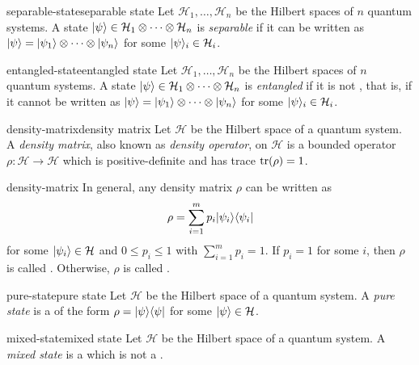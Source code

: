 \begin{topic}{separable-state}{separable state}
    Let $\mathcal{H}_1, \ldots, \mathcal{H}_n$ be the Hilbert spaces of $n$ quantum systems. A state $|\psi\rangle \in \mathcal{H}_1 \otimes \cdots \otimes \mathcal{H}_n$ is \emph{separable} if it can be written as $|\psi\rangle = |\psi_1\rangle \otimes \cdots \otimes |\psi_n\rangle$ for some $|\psi\rangle_i \in \mathcal{H}_i$.
\end{topic}

\begin{topic}{entangled-state}{entangled state}
    Let $\mathcal{H}_1, \ldots, \mathcal{H}_n$ be the Hilbert spaces of $n$ quantum systems. A state $|\psi\rangle \in \mathcal{H}_1 \otimes \cdots \otimes \mathcal{H}_n$ is \emph{entangled} if it is not , that is, if it cannot be written as $|\psi\rangle = |\psi_1\rangle \otimes \cdots \otimes |\psi_n\rangle$ for some $|\psi\rangle_i \in \mathcal{H}_i$.
\end{topic}

\begin{topic}{density-matrix}{density matrix}
    Let $\mathcal{H}$ be the Hilbert space of a quantum system. A \emph{density matrix}, also known as \emph{density operator}, on $\mathcal{H}$ is a bounded operator $\rho \colon \mathcal{H} \to \mathcal{H}$ which is positive-definite and has trace $\operatorname{tr}(\rho) = 1$.
\end{topic}

\begin{example}{density-matrix}
    In general, any density matrix $\rho$ can be written as
    \[ \rho = \sum_{i = 1}^{m} p_i |\psi_i\rangle \langle\psi_i| \]
    for some $|\psi_i\rangle \in \mathcal{H}$ and $0 \le p_i \le 1$ with $\sum_{i = 1}^{m} p_i = 1$. If $p_i = 1$ for some $i$, then $\rho$ is called . Otherwise, $\rho$ is called .
\end{example}

\begin{topic}{pure-state}{pure state}
    Let $\mathcal{H}$ be the Hilbert space of a quantum system. A \emph{pure state} is a  of the form $\rho = |\psi\rangle \langle\psi|$ for some $|\psi\rangle \in \mathcal{H}$.
\end{topic}

\begin{topic}{mixed-state}{mixed state}
    Let $\mathcal{H}$ be the Hilbert space of a quantum system. A \emph{mixed state} is a  which is not a .
\end{topic}

